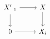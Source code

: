 \documentclass[12pt]{standalone}
\begin{document}
        $$

\begin{tikzcd}
X^\prime_{-1} \ar[r]\ar[d] & X \ar[d] \\
0 \ar[r] & X_i 
\end{tikzcd}
        $$
        
\end{document}
